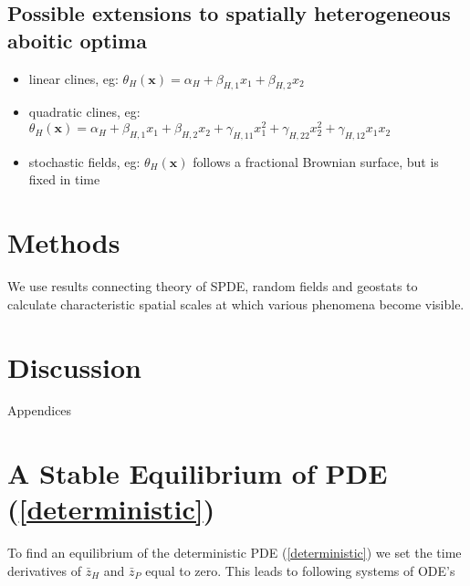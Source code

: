 \documentclass{article}
\begin{document}
\hypertarget{possible-extensions-to-spatially-heterogeneous-aboitic-optima}{%
\subsection{Possible extensions to spatially heterogeneous aboitic
optima}\label{possible-extensions-to-spatially-heterogeneous-aboitic-optima}}

\begin{itemize}
\tightlist
\item
  linear clines, eg:
  \(\theta_H(\pmb x)=\alpha_H+\beta_{H,1}x_1+\beta_{H,2}x_2\)
\item
  quadratic clines, eg:
  \(\theta_H(\pmb x)=\alpha_H+\beta_{H,1}x_1+\beta_{H,2}x_2+\gamma_{H,11}x_1^2+\gamma_{H,22}x_2^2+\gamma_{H,12}x_1x_2\)
\item
  stochastic fields, eg: \(\theta_H(\pmb x)\) follows a fractional
  Brownian surface, but is fixed in time
\end{itemize}

\hypertarget{methods}{%
\section{Methods}\label{methods}}

We use results connecting theory of SPDE, random fields and geostats to
calculate characteristic spatial scales at which various phenomena
become visible.

\hypertarget{discussion}{%
\section{Discussion}\label{discussion}}

\newpage

\begin{center}
  \Large Appendices
\end{center}

\appendix

\hypertarget{a-stable-equilibrium-of-pde}{%
\section{\texorpdfstring{A Stable Equilibrium of PDE
(\ref{deterministic})}{A Stable Equilibrium of PDE ()}}\label{a-stable-equilibrium-of-pde}}

To find an equilibrium of the deterministic PDE (\ref{deterministic}) we
set the time derivatives of \(\bar z_H\) and \(\bar z_P\) equal to zero.
This leads to following systems of ODE's
\end{document}
